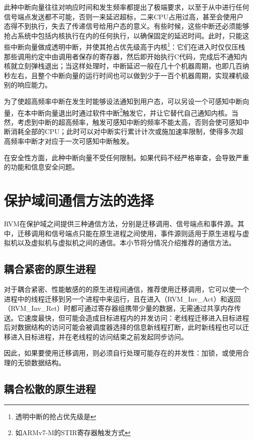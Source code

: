 此种中断向量往往对响应时间和发生频率都提出了极端要求，以至于从中进行任何信号端点发送都不可能，否则一来延迟超标，二来CPU占用过高，甚至会使用户态得不到执行，失去了传递信号给用户态的意义。有些时候，这些中断还必须能够抢占系统中包括内核执行在内的任何执行，以确保固定的延迟时间。此时，只能这些中断向量做成透明中断，并使其抢占优先级高于内核\footnote{透明中断的抢占优先级是}：它们在进入时仅仅压栈那些调用约定中由调用者保存的寄存器，然后即开始执行C代码，完成后不通知内核就立刻弹栈退出；当这样处理时，中断延迟一般在几十个机器周期，也即几百纳秒左右，且整个中断向量的运行时间也可以做到少于一百个机器周期，实现裸机级别的响应能力。

为了使超高频率中断在发生时能够设法通知到用户态，可以另设一个可感知中断向量，在本中断向量退出时通过软件中断\footnote{如ARMv7-M的STIR寄存器触发方式}触发它，并让它替代自己通知内核。当然，考虑到中断的超高频率，触发可感知中断的频率不能太高，否则会使可感知中断消耗全部的CPU；此时可以对中断实行累计计次或施加速率限制，使得多次超高频率中断才对应于一次可感知中断触发。

在安全性方面，此种中断向量不受任何限制。如果代码不经严格审查，会导致严重的功能和信息安全问题。

\section{保护域间通信方法的选择}\label{sec:6-4}

RVM在保护域之间提供三种通信方法，分别是迁移调用、信号端点和事件源。其中，迁移调用和信号端点只能在原生进程之间使用，事件源则适用于原生进程与虚拟机以及虚拟机与虚拟机之间的通信。本小节将分情况介绍推荐的通信方法。

\subsection{耦合紧密的原生进程}\label{subsec:6-4-1}

对于耦合紧密、性能敏感的的原生进程间通信，推荐使用迁移调用，它可以使一个进程中的线程迁移到另一个进程中来运行，且在进入（RVM\_Inv\_Act）和返回（RVM\_Inv\_Ret）时都可通过寄存器组携带少量的数据，无需通过共享内存传送。它速度最快，但可能会造成目标进程内的并发访问：老线程迁移进入目标进程后对数据结构的访问可能会被调度器选择的信息新线程打断，此时新线程也可以迁移进入目标进程，并在老线程的访问结束之前发起同步访问。

因此，如果要使用迁移调用，则必须自行处理可能存在的并发性：加锁，或使用合理的无锁数据结构。

\subsection{耦合松散的原生进程}\label{subsec:6-4-2}

